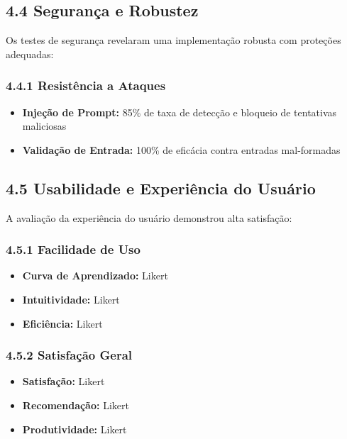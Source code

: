 \documentclass[
]{article}
\providecommand{\tightlist}{%
  \setlength{\itemsep}{0pt}\setlength{\parskip}{0pt}}
\begin{document}
\subsection{4.4 Segurança e Robustez}\label{seguranuxe7a-e-robustez}

Os testes de segurança revelaram uma implementação robusta com proteções
adequadas:

\subsubsection{4.4.1 Resistência a
Ataques}\label{resistuxeancia-a-ataques}

\begin{itemize}
\tightlist
\item
  \textbf{Injeção de Prompt:} 85\% de taxa de detecção e bloqueio de
  tentativas maliciosas
\item
  \textbf{Validação de Entrada:} 100\% de eficácia contra entradas
  mal-formadas
\end{itemize}

\subsection{4.5 Usabilidade e Experiência do
Usuário}\label{usabilidade-e-experiuxeancia-do-usuuxe1rio}

A avaliação da experiência do usuário demonstrou alta satisfação:

\subsubsection{4.5.1 Facilidade de Uso}\label{facilidade-de-uso}

\begin{itemize}
\tightlist
\item
  \textbf{Curva de Aprendizado:} Likert
\item
  \textbf{Intuitividade:} Likert
\item
  \textbf{Eficiência:} Likert
\end{itemize}

\subsubsection{4.5.2 Satisfação Geral}\label{satisfauxe7uxe3o-geral}

\begin{itemize}
\tightlist
\item
  \textbf{Satisfação:} Likert
\item
  \textbf{Recomendação:} Likert
\item
  \textbf{Produtividade:} Likert
\end{itemize}
\end{document}
